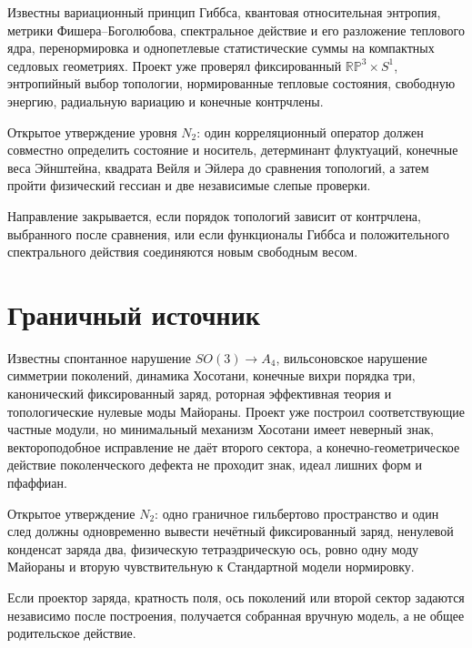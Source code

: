 Известны вариационный принцип Гиббса, квантовая относительная энтропия,
метрики Фишера--Боголюбова, спектральное действие и его разложение теплового
ядра, перенормировка и однопетлевые статистические суммы на компактных
седловых геометриях. Проект уже проверял фиксированный
\(\mathbb{RP}^3\times S^1\), энтропийный выбор топологии, нормированные
тепловые состояния, свободную энергию, радиальную вариацию и конечные
контрчлены.

Открытое утверждение уровня \(N_2\): один корреляционный оператор должен
совместно определить состояние и носитель, детерминант флуктуаций, конечные
веса Эйнштейна, квадрата Вейля и Эйлера до сравнения топологий, а затем
пройти физический гессиан и две независимые слепые проверки.

\begin{nogocriterion}
Направление закрывается, если порядок топологий зависит от контрчлена,
выбранного после сравнения, или если функционалы Гиббса и положительного
спектрального действия соединяются новым свободным весом.
\end{nogocriterion}

\section{Граничный источник}

Известны спонтанное нарушение \(SO(3)\to A_4\), вильсоновское нарушение
симметрии поколений, динамика Хосотани, конечные вихри порядка три,
канонический фиксированный заряд, роторная эффективная теория и
топологические нулевые моды Майораны. Проект уже построил соответствующие
частные модули, но минимальный механизм Хосотани имеет неверный знак,
вектороподобное исправление не даёт второго сектора, а конечно-геометрическое
действие поколенческого дефекта не проходит знак, идеал лишних форм и
пфаффиан.

Открытое утверждение \(N_2\): одно граничное гильбертово пространство и один
след должны одновременно вывести нечётный фиксированный заряд, ненулевой
конденсат заряда два, физическую тетраэдрическую ось, ровно одну моду
Майораны и вторую чувствительную к Стандартной модели нормировку.

\begin{nogocriterion}
Если проектор заряда, кратность поля, ось поколений или второй сектор
задаются независимо после построения, получается собранная вручную модель,
а не общее родительское действие.
\end{nogocriterion}

